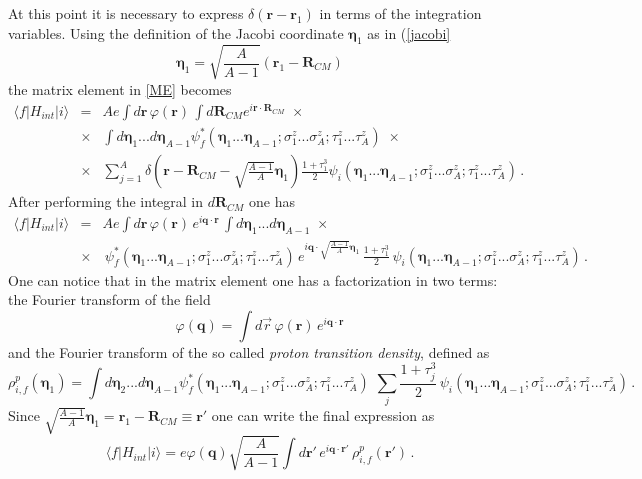 At this point it is necessary to express 
$\delta(\mathbf{r}-\mathbf{r}_1)$ in terms of the integration variables. Using the definition of the Jacobi coordinate $\bm{\eta}_1$  
as in (\ref{jacobi}
\begin{equation}
\bm{\eta}_1=\sqrt{\frac{A}{A-1}}(\mathbf{r}_1 - \mathbf{R}_{CM})
\end{equation}
the matrix element in \ref{ME} becomes
\begin{eqnarray}\label{MEE} 
 \langle f|H_{int}|i\rangle &=& A e \int d\mathbf{r} \,\varphi(\mathbf{r})\,\int d\mathbf{R}_{CM}  e^{i\mathbf{r}\cdot\mathbf{R}_{CM}}
  \,\,\times \nonumber\\
 &\times& \int d\bm{\eta}_1...d\bm{\eta}_{A-1}\psi^*_f(\bm{\eta}_1...\bm{\eta}_{A-1}; 
 \sigma_1^z...\sigma_A^z;\tau_1^z...\tau_A^z)\,\,\times \nonumber\\
 &\times&\sum_{j=1}^A  \delta\left(\mathbf{r}-\mathbf{R}_{CM}-\sqrt{\frac{A-1}{A}} 
 \bm{\eta}_1\right)\frac{1+\tau_1^3}{2} \psi_i(\bm{\eta}_1...\bm{\eta}_{A-1}; 
 \sigma_1^z...\sigma_A^z;\tau_1^z...\tau_A^z)\,.
\end{eqnarray}
After performing the integral in $d\mathbf{R}_{CM}$ one has
\begin{eqnarray}   
 \langle f|H_{int}|i\rangle &=& A e \int d\mathbf{r} \,\varphi(\mathbf{r})\,e^{i\mathbf{q}\cdot\mathbf{r}}\,\int d\bm{\eta}_1...d\bm{\eta}_{A-1} 
  \,\,\times \nonumber\\
&\times&\, \psi^*_f(\bm{\eta}_1...\bm{\eta}_{A-1}; \sigma_1^z...\sigma_A^z;\tau_1^z...\tau_A^z)\,
e^{i\mathbf{q}\cdot\sqrt{\frac{A-1}{A}}\bm{\eta}_1}\,\frac{1+\tau_1^3}{2} \,\psi_i(\bm{\eta}_1...\bm{\eta}_{A-1}; 
 \sigma_1^z...\sigma_A^z;\tau_1^z...\tau_A^z)\,.
\end{eqnarray}
One can notice that in the matrix element one has a factorization in two terms: the Fourier transform of the field 
\begin{equation}
 \varphi(\mathbf{q})=\int d\vec r \,\varphi(\mathbf{r})\,e^{i\mathbf{q}\cdot\mathbf{r}}
\end{equation}
and the Fourier transform of the so called {\it proton transition density}, defined as
\begin{equation}
 \rho_{i,f}^p(\bm{\eta}_1) =\int d\bm{\eta}_2...d\bm{\eta}_{A-1} 
 \psi^*_f(\bm{\eta}_1...\bm{\eta}_{A-1}; \sigma_1^z...\sigma_A^z;\tau_1^z...\tau_A^z)\,
\,\sum_j\frac{1+\tau_j^3}{2} \,\psi_i(\bm{\eta}_1...\bm{\eta}_{A-1}; 
 \sigma_1^z...\sigma_A^z;\tau_1^z...\tau_A^z)\,.
\end{equation}
Since $\sqrt{\frac{A-1}{A}}\bm{\eta}_1=\mathbf{r}_1-\mathbf{R}_{CM}\equiv \mathbf{r}'$ one can write  the final expression as
\begin{equation}
\langle f|H_{int}|i\rangle =  e \varphi(\mathbf{q}) \sqrt{\frac{A}{A-1}}\int d\mathbf{r}' \,e^{i\mathbf{q}\cdot\mathbf{r}'}\, \rho^p_{i,f}(\mathbf{r}')\,.
\end{equation}

